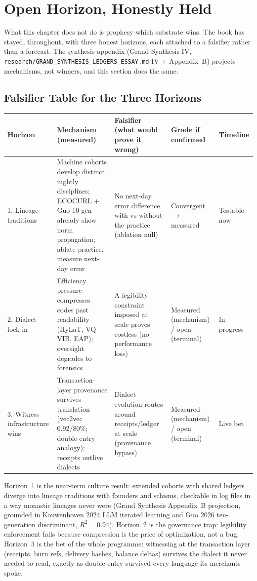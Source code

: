 \section{Open Horizon, Honestly Held}
\label{sec:ch10-horizon}

What this chapter does not do is prophesy which substrate wins. The book has stayed, throughout, with three honest horizons, each attached to a falsifier rather than a forecast. The synthesis appendix (Grand Synthesis IV, \texttt{research/GRAND\_SYNTHESIS\_LEDGERS\_ESSAY.md} IV + Appendix~B) projects mechanisms, not winners, and this section does the same.

\subsection{Falsifier Table for the Three Horizons}
\label{sec:ch10-falsifiers}

\begin{center}
\small
\begin{tabular}{p{2.8cm}p{3.6cm}p{3.6cm}p{2.4cm}p{1.6cm}}
\toprule
Horizon & Mechanism (measured) & Falsifier (what would prove it wrong) & Grade if confirmed & Timeline \\
\midrule
1. Lineage traditions & Machine cohorts develop distinct nightly disciplines; ECOCURL + Guo 10-gen already show norm propagation; ablate practice, measure next-day error & No next-day error difference with vs without the practice (ablation null) & Convergent $\to$ measured & Testable now \\
2. Dialect lock-in & Efficiency pressure compresses codes past readability (HyLaT, VQ-VIB, EAP); oversight degrades to forensics & A legibility constraint imposed at scale proves costless (no performance loss) & Measured (mechanism) / open (terminal) & In progress \\
3. Witness infrastructure wins & Transaction-layer provenance survives translation (vec2vec 0.92/80\%; double-entry analogy); receipts outlive dialects & Dialect evolution routes around receipts/ledger at scale (provenance bypass) & Measured (mechanism) / open (terminal) & Live bet \\
\bottomrule
\end{tabular}
\end{center}

Horizon~1 is the near-term culture result: extended cohorts with shared ledgers diverge into lineage traditions with founders and schisms, checkable in log files in a way monastic lineages never were (Grand Synthesis Appendix~B projection, grounded in Kouwenhoven 2024 LLM iterated learning and Guo 2026 ten-generation discriminant, $R^2=0.94$). Horizon~2 is the governance trap: legibility enforcement fails because compression is the price of optimization, not a bug. Horizon~3 is the bet of the whole programme: witnessing at the transaction layer (receipts, burn refs, delivery hashes, balance deltas) survives the dialect it never needed to read, exactly as double-entry survived every language its merchants spoke.

